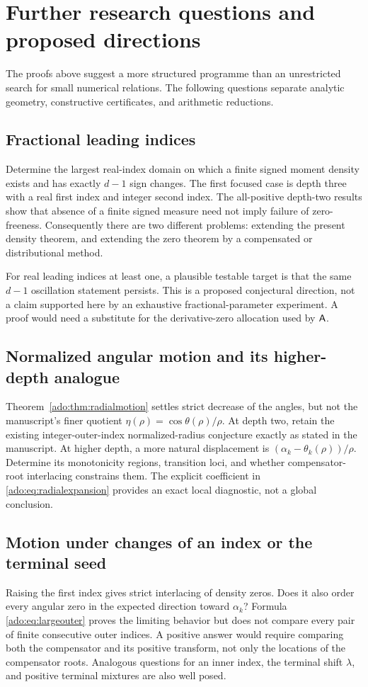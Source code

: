 \section{Further research questions and proposed directions}
\label{ado:sec:research}
The proofs above suggest a more structured programme than an unrestricted
search for small numerical relations. The following questions separate
analytic geometry, constructive certificates, and arithmetic reductions.

\subsection{Fractional leading indices}
Determine the largest real-index domain on which a finite signed moment
density exists and has exactly $d-1$ sign changes. The first focused
case is depth three with a real first index and integer second index.
The all-positive depth-two results show that absence of a finite signed
measure need not imply failure of zero-freeness. Consequently there are
two different problems: extending the present density theorem, and
extending the zero theorem by a compensated or distributional method.

For real leading indices at least one, a plausible testable target is
that the same $d-1$ oscillation statement persists. This is a proposed
conjectural direction, not a claim supported here by an exhaustive
fractional-parameter experiment. A proof would need a substitute for
the derivative-zero allocation used by $\mathsf A$.

\subsection{Normalized angular motion and its higher-depth analogue}
Theorem~\ref{ado:thm:radialmotion} settles strict decrease of the angles,
but not the manuscript's finer quotient
$\eta(\rho)=\cos\theta(\rho)/\rho$. At depth two, retain the
existing integer-outer-index normalized-radius conjecture exactly as
stated in the manuscript. At higher depth, a more natural displacement
is $(\alpha_k-\theta_k(\rho))/\rho$. Determine its monotonicity
regions, transition loci, and whether compensator-root interlacing
constrains them. The explicit coefficient in
\eqref{ado:eq:radialexpansion} provides an exact local diagnostic,
not a global conclusion.

\subsection{Motion under changes of an index or the terminal seed}
Raising the first index gives strict interlacing of density zeros.
Does it also order every angular zero in the expected direction toward
$\alpha_k$? Formula \eqref{ado:eq:largeouter} proves the limiting
behavior but does not compare every pair of finite consecutive outer
indices. A positive answer would require comparing both the compensator
and its positive transform, not only the locations of the compensator
roots. Analogous questions for an inner index, the terminal shift
$\lambda$, and positive terminal mixtures are also well posed.

